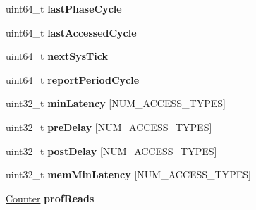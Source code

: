 \begin{DoxyCompactItemize}
\item 
\hypertarget{classMemControllerBase_a6e424049a13aa802ac437ee3fb698420}{uint64\-\_\-t {\bfseries last\-Phase\-Cycle}}\label{classMemControllerBase_a6e424049a13aa802ac437ee3fb698420}

\item 
\hypertarget{classMemControllerBase_a16f3ca2a55ff3354e492c13cde62cace}{uint64\-\_\-t {\bfseries last\-Accessed\-Cycle}}\label{classMemControllerBase_a16f3ca2a55ff3354e492c13cde62cace}

\item 
\hypertarget{classMemControllerBase_ae27a15b7a838401a8ec61a6bb38834d6}{uint64\-\_\-t {\bfseries next\-Sys\-Tick}}\label{classMemControllerBase_ae27a15b7a838401a8ec61a6bb38834d6}

\item 
\hypertarget{classMemControllerBase_aed5a352c4f08eba314634c2c8a5fd6f9}{uint64\-\_\-t {\bfseries report\-Period\-Cycle}}\label{classMemControllerBase_aed5a352c4f08eba314634c2c8a5fd6f9}

\item 
\hypertarget{classMemControllerBase_a29e2a523e81c36342bdb5dc6fcf17896}{uint32\-\_\-t {\bfseries min\-Latency} \mbox{[}N\-U\-M\-\_\-\-A\-C\-C\-E\-S\-S\-\_\-\-T\-Y\-P\-E\-S\mbox{]}}\label{classMemControllerBase_a29e2a523e81c36342bdb5dc6fcf17896}

\item 
\hypertarget{classMemControllerBase_aed6ebab68ec44540555d3bb9066e0d09}{uint32\-\_\-t {\bfseries pre\-Delay} \mbox{[}N\-U\-M\-\_\-\-A\-C\-C\-E\-S\-S\-\_\-\-T\-Y\-P\-E\-S\mbox{]}}\label{classMemControllerBase_aed6ebab68ec44540555d3bb9066e0d09}

\item 
\hypertarget{classMemControllerBase_a211323b56348c010f0977748150dd785}{uint32\-\_\-t {\bfseries post\-Delay} \mbox{[}N\-U\-M\-\_\-\-A\-C\-C\-E\-S\-S\-\_\-\-T\-Y\-P\-E\-S\mbox{]}}\label{classMemControllerBase_a211323b56348c010f0977748150dd785}

\item 
\hypertarget{classMemControllerBase_ae3a7adebf0d2569bfd90b089ee497f41}{uint32\-\_\-t {\bfseries mem\-Min\-Latency} \mbox{[}N\-U\-M\-\_\-\-A\-C\-C\-E\-S\-S\-\_\-\-T\-Y\-P\-E\-S\mbox{]}}\label{classMemControllerBase_ae3a7adebf0d2569bfd90b089ee497f41}

\item 
\hypertarget{classMemControllerBase_ae929fe2f7d8d019a62e5f2f5b80d3cf7}{\hyperlink{classCounter}{Counter} {\bfseries prof\-Reads}}\label{classMemControllerBase_ae929fe2f7d8d019a62e5f2f5b80d3cf7}


\end{DoxyCompactItemize}
